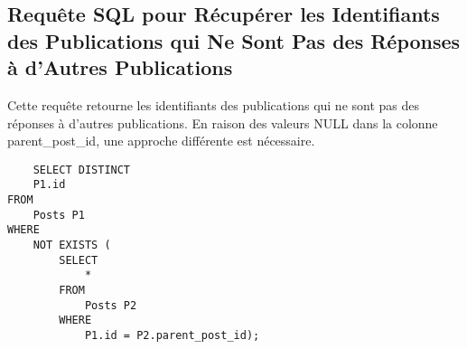 \subsection{Requête SQL pour Récupérer les Identifiants des Publications qui Ne Sont Pas des Réponses à d'Autres Publications}

Cette requête retourne les identifiants des publications qui ne sont pas des réponses à d'autres publications. En raison des valeurs NULL dans la colonne parent\_post\_id, une approche différente est nécessaire.

\begin{lstlisting}
    SELECT DISTINCT
    P1.id
FROM
    Posts P1
WHERE
    NOT EXISTS (
        SELECT
            *
        FROM
            Posts P2
        WHERE
            P1.id = P2.parent_post_id);
\end{lstlisting}